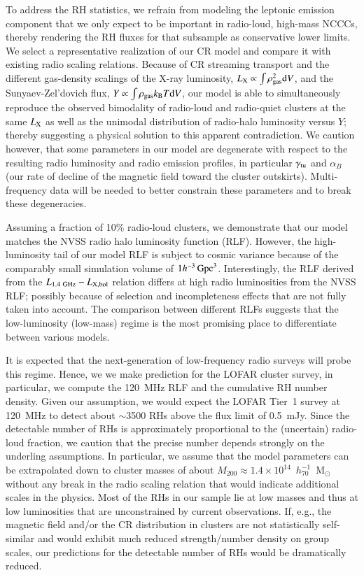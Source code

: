 \documentclass[useAMS,usenatbib]{mn2e}
\newcommand{\dd}{\mathrm{d}}
\begin{document}
To address the RH statistics, we refrain from modeling the leptonic emission
component that we only expect to be important in radio-loud, high-mass NCCCs,
thereby rendering the RH fluxes for that subsample as conservative lower
limits. We select a representative realization of our CR model and compare it
with existing radio scaling relations.  Because of CR streaming transport and
the different gas-density scalings of the X-ray luminosity,
$L_{\rmn{X}}\propto\int \rho_\rmn{gas}^2 \dd V$, and the Sunyaev-Zel'dovich
flux, $Y\propto\int \rho_{\rmn{gas}} k_{\rmn{B}} T \dd V$, our model is able to
simultaneously reproduce the observed bimodality of radio-loud and radio-quiet
clusters at the same $L_{{\mathrm{X}}}$ as well as the unimodal distribution of
radio-halo luminosity versus $Y$; thereby suggesting a physical solution to this
apparent contradiction. We caution however, that some parameters in our model
are degenerate with respect to the resulting radio luminosity and radio emission
profiles, in particular $\gamma_{{\mathrm{tu}}}$ and $\alpha_B$ (our rate of decline
of the magnetic field toward the cluster outskirts). Multi-frequency data will
be needed to better constrain these parameters and to break these degeneracies.

Assuming a fraction of 10\% radio-loud clusters, we demonstrate that our model
matches the NVSS radio halo luminosity function (RLF). However, the
high-luminosity tail of our model RLF is subject to cosmic variance because of
the comparably small simulation volume of $1
h^{-3}\,{\mathrm{Gpc}}^3$. Interestingly, the RLF derived from the
$L_{1.4~{\mathrm{GHz}}}-L_{{\mathrm{X,bol}}}$ relation differs at high radio luminosities
from the NVSS RLF; possibly because of selection and incompleteness effects that
are not fully taken into account. The comparison between different RLFs suggests
that the low-luminosity (low-mass) regime is the most promising place to
differentiate between various models.

It is expected that the next-generation of low-frequency radio surveys will
probe this regime. Hence, we we make prediction for the LOFAR cluster survey, in
particular, we compute the 120~MHz RLF and the cumulative RH number
density. Given our assumption, we would expect the LOFAR Tier~1 survey at
120~MHz to detect about $\sim$3500 RHs above the flux limit of 0.5~mJy. Since
the detectable number of RHs is approximately proportional to the (uncertain)
radio-loud fraction, we caution that the precise number depends strongly on the
underling assumptions. In particular, we assume that the model parameters can be
extrapolated down to cluster masses of about
$M_{200}\approx1.4\times10^{14}$~$h_{70}^{-1}$~M$_{\odot}$ without any break in
the radio scaling relation that would indicate additional scales in the physics.
Most of the RHs in our sample lie at low masses and thus at low luminosities
that are unconstrained by current observations. If, e.g., the magnetic field
and/or the CR distribution in clusters are not statistically self-similar and
would exhibit much reduced strength/number density on group scales, our
predictions for the detectable number of RHs would be dramatically reduced.
\end{document}
